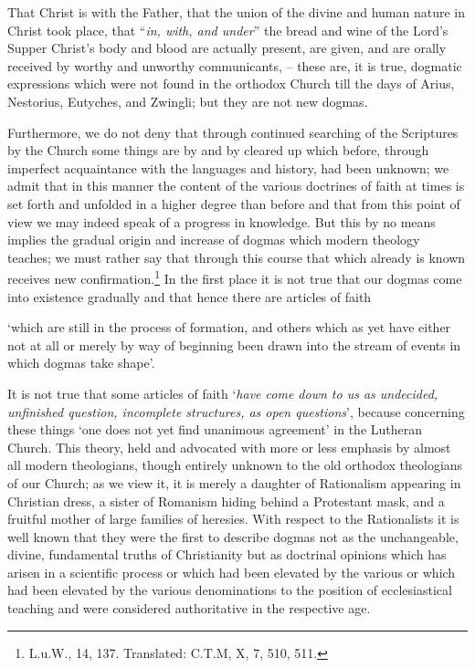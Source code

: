 \begin{fancyquotes}
                \par That Christ is with the Father, that the union of the divine and human nature in Christ took place, that “\textit{in, with, and under}” the bread and wine of the Lord’s Supper Christ’s body and blood are actually present, are given, and are orally received by worthy and unworthy communicants, -- these are, it is true, dogmatic expressions which were not found in the orthodox Church till the days of Arius, Nestorius, Eutyches, and Zwingli; but they are not new dogmas. \par Furthermore, we do not deny that through continued searching of the Scriptures by the Church some things are by and by cleared up which before, through imperfect acquaintance with the languages and history, had been unknown; we admit that in this manner the content of the various doctrines of faith at times is set forth and unfolded in a higher degree than before and that from this point of view we may indeed speak of a progress in knowledge.  But this by no means implies the gradual origin and increase of dogmas which modern theology teaches; we must rather say that through this course that which already is known receives new confirmation.\footnote{L.u.W., 14, 137. Translated: C.T.M, X, 7, 510, 511.}  In the first place it is not true that our dogmas come into existence gradually and that hence there are articles of faith \begin{displayquote}{\footnotesize `which are still in the process of formation, and others which as yet have either not at all or merely by way of beginning been drawn into the stream of events in which dogmas take shape’.}\end{displayquote}  It is not true that some articles of faith ‘\textit{have come down to us as undecided, unfinished question, incomplete structures, as open questions}’, because concerning these things ‘one does not yet find unanimous agreement’ in the Lutheran Church.  This theory, held and advocated with more or less emphasis by almost all modern theologians, though entirely unknown to the old orthodox theologians of our Church; as we view it, it is merely a daughter of Rationalism appearing in Christian dress, a sister of Romanism hiding behind a Protestant mask, and a fruitful mother of large families of heresies.  With respect to the Rationalists it is well known that they were the first to describe dogmas not as the unchangeable, divine, fundamental truths of Christianity but as doctrinal opinions which has arisen in a scientific process or which had been elevated by the various or which had been elevated by the various denominations to the position of ecclesiastical teaching and were considered authoritative in the respective age.

\end{fancyquotes}
